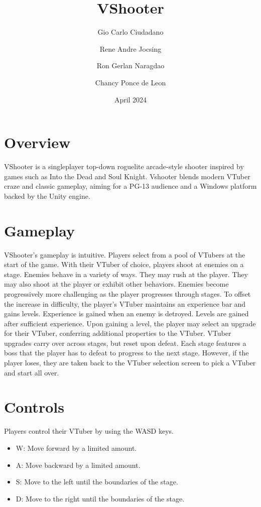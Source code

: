 \documentclass[10pt, a4paper]{article}
\title{\textbf{VShooter}}
\author{Gio Carlo Ciudadano \and Rene Andre Jocsing \and Ron Gerlan Naragdao \and Chancy Ponce de Leon}
\date{April 2024}
\begin{document}
\maketitle

	\begin{multicols}{2}

	\section{Overview}

	VShooter is a singleplayer top-down roguelite arcade-style shooter inspired by games such as Into the Dead and Soul Knight. Vshooter blends modern VTuber craze and classic gameplay, aiming for a PG-13 audience and a Windows platform backed by the Unity engine.

  	\section{Gameplay}

	VShooter's gameplay is intuitive. Players select from a pool of VTubers at the start of the game. With their VTuber of choice, players shoot at enemies on a stage. Enemies behave in a variety of ways. They may rush at the player. They may also shoot at the player or exhibit other behaviors. Enemies become progressively more challenging as the player progresses through stages. To offset the increase in difficulty, the player's VTuber maintains an experience bar and gains levels. Experience is gained when an enemy is detroyed. Levels are gained after sufficient experience. Upon gaining a level, the player may select an upgrade for their VTuber, conferring additional properties to the VTuber. VTuber upgrades carry over across stages, but reset upon defeat. Each stage features a boss that the player has to defeat to progress to the next stage. However, if the player loses, they are taken back to the VTuber selection screen to pick a VTuber and start all over.

	\section{Controls}

	Players control their VTuber by using the WASD keys.

	\begin{itemize}
		\item W: Move forward by a limited amount.
		\item A: Move backward by a limited amount.
		\item S: Move to the left until the boundaries of the stage.
		\item D: Move to the right until the boundaries of the stage.
	\end{itemize}


\end{multicols}
\end{document}
